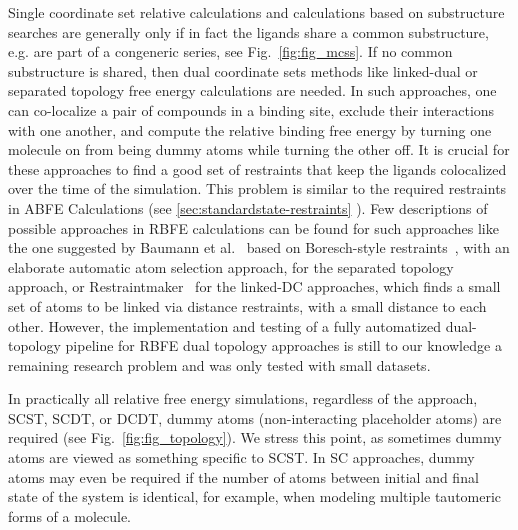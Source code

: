 \documentclass[9pt,bestpractices]{livecoms}
\begin{document}
Single coordinate set relative calculations and calculations based on substructure searches are generally only if in fact the ligands share a common substructure, e.g. are part of a congeneric series, see Fig.~\ref{fig:fig_mcss}.
If no common substructure is shared, then dual coordinate sets methods like linked-dual or separated topology free energy calculations are needed. In such approaches, one can co-localize a pair of compounds in a binding site, exclude their interactions with one another, and compute the relative binding free energy by turning one molecule on from being dummy atoms while turning the other off.
It is crucial for these approaches to find a good set of restraints that keep the ligands colocalized over the time of the simulation. This problem is similar to the required restraints in ABFE Calculations (see \ref{sec:standardstate-restraints} ). Few descriptions of possible approaches in RBFE calculations can be found for such approaches like the one suggested by Baumann et al.~\cite{baumann2023broadening} based on Boresch-style restraints~\cite{boresch2003absolute}, with an elaborate automatic atom selection approach, for the separated topology approach, or Restraintmaker~\cite{ries2022restraintmaker} for the linked-DC approaches, which finds a small set of atoms to be linked via distance restraints, with a small distance to each other. 
However, the implementation and testing of a fully automatized dual-topology pipeline for RBFE dual topology approaches is still to our knowledge a remaining research problem and was only tested with small datasets.~\cite{jespers2019qligfep, rieder2022lev}

\label{subsec: Dummy Atoms}

In practically all relative free energy simulations, regardless of the approach, SCST, SCDT, or DCDT, dummy atoms (non-interacting placeholder atoms) are required (see Fig.~\ref{fig:fig_topology}). We stress this point, as sometimes dummy atoms are viewed as something specific to SCST. In SC approaches, dummy atoms may even be required if the number of atoms between initial and final state of the system is identical, for example, when modeling multiple tautomeric forms of a molecule.
\end{document}

